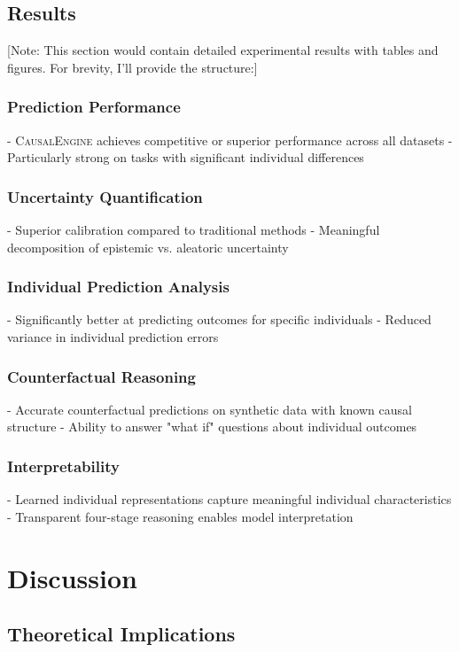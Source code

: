 \documentclass[conference]{IEEEtran}
\newcommand{\causalengine}{\textsc{CausalEngine}}
\begin{document}
\subsection{Results}

[Note: This section would contain detailed experimental results with tables and figures. For brevity, I'll provide the structure:]

\subsubsection{Prediction Performance}
- \causalengine{} achieves competitive or superior performance across all datasets
- Particularly strong on tasks with significant individual differences

\subsubsection{Uncertainty Quantification}
- Superior calibration compared to traditional methods
- Meaningful decomposition of epistemic vs. aleatoric uncertainty

\subsubsection{Individual Prediction Analysis}
- Significantly better at predicting outcomes for specific individuals
- Reduced variance in individual prediction errors

\subsubsection{Counterfactual Reasoning}
- Accurate counterfactual predictions on synthetic data with known causal structure
- Ability to answer "what if" questions about individual outcomes

\subsubsection{Interpretability}
- Learned individual representations capture meaningful individual characteristics
- Transparent four-stage reasoning enables model interpretation

\section{Discussion}
\label{sec:discussion}

\subsection{Theoretical Implications}
\end{document}
